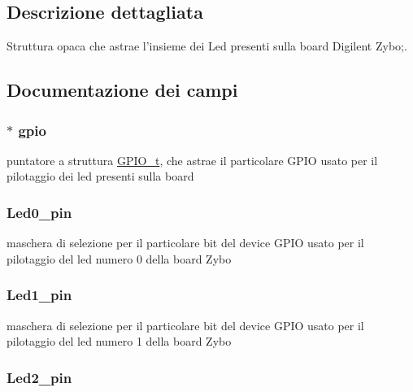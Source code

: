\subsection{Descrizione dettagliata}
Struttura opaca che astrae l'insieme dei Led presenti sulla board Digilent Zybo;. 

\subsection{Documentazione dei campi}
\hypertarget{struct_zybo_led__t_acb3116190992a4d8d26545c103304d27}{
\subsubsection[{gpio}]{$\ast$ gpio}}\label{struct_zybo_led__t_acb3116190992a4d8d26545c103304d27}
puntatore a struttura \hyperlink{struct_g_p_i_o__t}{G\+P\+I\+O\+\_\+t}, che astrae il particolare G\+P\+I\+O usato per il pilotaggio dei led presenti sulla board \hypertarget{struct_zybo_led__t_aa4d077e557e43132a3100ab30b60165c}{
\subsubsection[{Led0\+\_\+pin}]{ Led0\+\_\+pin}}\label{struct_zybo_led__t_aa4d077e557e43132a3100ab30b60165c}
maschera di selezione per il particolare bit del device G\+P\+I\+O usato per il pilotaggio del led numero 0 della board Zybo \hypertarget{struct_zybo_led__t_a2ee8b92c08972eb1b5bb1b72f4a9d305}{
\subsubsection[{Led1\+\_\+pin}]{ Led1\+\_\+pin}}\label{struct_zybo_led__t_a2ee8b92c08972eb1b5bb1b72f4a9d305}
maschera di selezione per il particolare bit del device G\+P\+I\+O usato per il pilotaggio del led numero 1 della board Zybo \hypertarget{struct_zybo_led__t_a566ca7784af030de3be9244c99066a5c}{
\subsubsection[{Led2\+\_\+pin}]{ Led2\+\_\+pin}}\label{struct_zybo_led__t_a566ca7784af030de3be9244c99066a5c}
